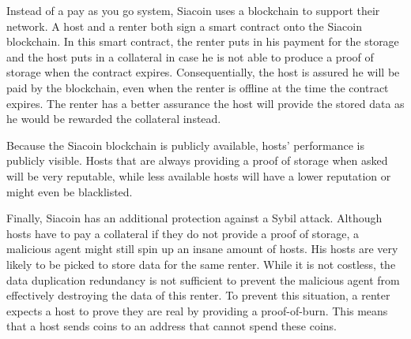 \fi

Instead of a pay as you go system, Siacoin uses a blockchain to support their network. A host and a renter both sign a smart contract onto the Siacoin blockchain. In this smart contract, the renter puts in his payment for the storage and the host puts in a collateral in case he is not able to produce a proof of storage when the contract expires. Consequentially, the host is assured he will be paid by the blockchain, even when the renter is offline at the time the contract expires. The renter has a better assurance the host will provide the stored data as he would be rewarded the collateral instead.

Because the Siacoin blockchain is publicly available, hosts' performance is publicly visible. Hosts that are always providing a proof of storage when asked will be very reputable, while less available hosts will have a lower reputation or might even be blacklisted.

Finally, Siacoin has an additional protection against a Sybil attack. Although hosts have to pay a collateral if they do not provide a proof of storage, a malicious agent might still spin up an insane amount of hosts. His hosts are very likely to be picked to store data for the same renter. While it is not costless, the data duplication redundancy is not sufficient to prevent the malicious agent from effectively destroying the data of this renter. To prevent this situation, a renter expects a host to prove they are real by providing a proof-of-burn. This means that a host sends coins to an address that cannot spend these coins. \cite{siacoin}